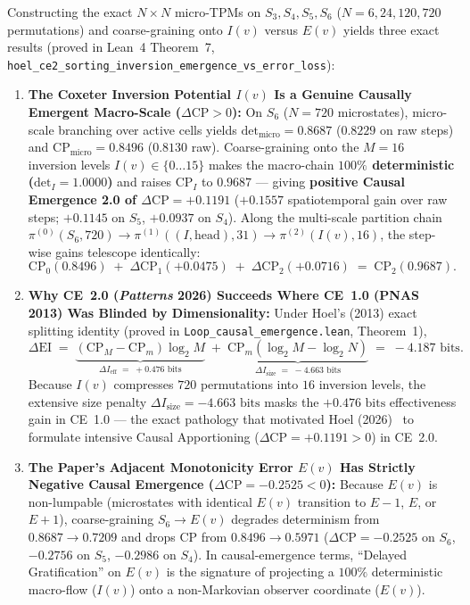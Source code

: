 \documentclass[11pt,a4paper]{article}
\theoremstyle{definition}
\theoremstyle{remark}
\begin{document}
Constructing the exact $N \times N$ micro-TPMs on $S_3, S_4, S_5, S_6$ ($N = 6, 24, 120, 720$ permutations) and coarse-graining onto $I(v)$ versus $E(v)$ yields three exact results (proved in Lean~4 Theorem~7, \texttt{hoel\_ce2\_sorting\_inversion\_emergence\_vs\_error\_loss}):
\begin{enumerate}
  \item \textbf{The Coxeter Inversion Potential $I(v)$ Is a Genuine Causally Emergent Macro-Scale ($\Delta\mathrm{CP} > 0$):} On $S_6$ ($N = 720$ microstates), micro-scale branching over active cells yields $\mathrm{det}_{\mathrm{micro}} = 0.8687$ ($0.8229$ on raw steps) and $\mathrm{CP}_{\mathrm{micro}} = 0.8496$ ($0.8130$ raw). Coarse-graining onto the $M = 16$ inversion levels $I(v) \in \{0 \dots 15\}$ makes the macro-chain \textbf{$100\%$ deterministic ($\mathrm{det}_I = 1.0000$)} and raises $\mathrm{CP}_I$ to $\mathbf{0.9687}$ --- giving \textbf{positive Causal Emergence 2.0 of $\Delta\mathrm{CP} = +0.1191$} ($+0.1557$ spatiotemporal gain over raw steps; $+0.1145$ on $S_5$, $+0.0937$ on $S_4$). Along the multi-scale partition chain $\pi^{(0)} (S_6, 720) \to \pi^{(1)} ((I, \text{head}), 31) \to \pi^{(2)} (I(v), 16)$, the step-wise gains telescope identically:
  \begin{equation}
    \mathrm{CP}_0 (0.8496) \;+\; \Delta\mathrm{CP}_1 (+0.0475) \;+\; \Delta\mathrm{CP}_2 (+0.0716) \;=\; \mathrm{CP}_2 (0.9687).
  \end{equation}
  \item \textbf{Why CE~2.0 (\emph{Patterns} 2026) Succeeds Where CE~1.0 (PNAS 2013) Was Blinded by Dimensionality:} Under Hoel's (2013) exact splitting identity (proved in \texttt{Loop\_causal\_emergence.lean}, Theorem~1),
  \begin{equation}
    \Delta\mathrm{EI} \;=\; \underbrace{(\mathrm{CP}_M - \mathrm{CP}_m)\log_2 M}_{\Delta I_{\mathrm{eff}} \;=\; +0.476\text{ bits}} \;+\; \underbrace{\mathrm{CP}_m (\log_2 M - \log_2 N)}_{\Delta I_{\mathrm{size}} \;=\; -4.663\text{ bits}} \;=\; -4.187\text{ bits}.
  \end{equation}
  Because $I(v)$ compresses $720$ permutations into $16$ inversion levels, the extensive size penalty $\Delta I_{\mathrm{size}} = -4.663\text{ bits}$ masks the $+0.476\text{ bits}$ effectiveness gain in CE~1.0 --- the exact pathology that motivated Hoel (2026)~\cite{Hoel2026Patterns} to formulate intensive Causal Apportioning ($\Delta\mathrm{CP} = +0.1191 > 0$) in CE~2.0.
  \item \textbf{The Paper's Adjacent Monotonicity Error $E(v)$ Has Strictly Negative Causal Emergence ($\Delta\mathrm{CP} = -0.2525 < 0$):} Because $E(v)$ is non-lumpable (microstates with identical $E(v)$ transition to $E-1$, $E$, or $E+1$), coarse-graining $S_6 \to E(v)$ degrades determinism from $0.8687 \to \mathbf{0.7209}$ and drops $\mathrm{CP}$ from $0.8496 \to \mathbf{0.5971}$ ($\Delta\mathrm{CP} = -0.2525$ on $S_6$, $-0.2756$ on $S_5$, $-0.2986$ on $S_4$). In causal-emergence terms, ``Delayed Gratification'' on $E(v)$ is the signature of projecting a $100\%$ deterministic macro-flow ($I(v)$) onto a non-Markovian observer coordinate ($E(v)$).
\end{enumerate}
\end{document}
